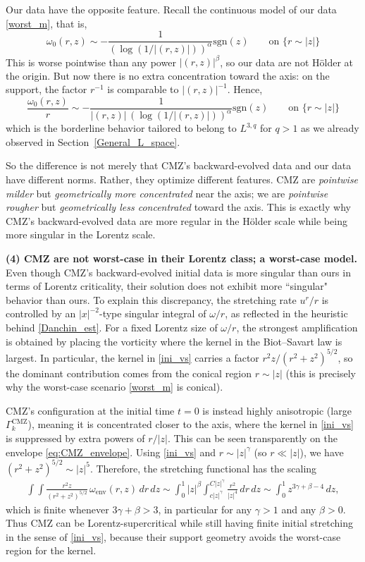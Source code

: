 \documentclass[reqno,11pt]{amsart}
\begin{document}
Our data have the opposite feature.  Recall the continuous model of our data \eqref{worst_m}, that is,
\[
\omega_0(r,z)\sim -\frac{1}{(\log(1/|(r,z)|))^\alpha}\mathrm{sgn}(z)
\qquad\text{on } \{r\sim |z|\}
\]
This is worse pointwise than any power $|(r,z)|^\beta$, so our data are not H\"older at
the origin.  But now there is no extra concentration toward the axis: on the support,
the factor $r^{-1}$ is  comparable to $|(r,z)|^{-1}$.  Hence, 
\[
\frac{\omega_0(r,z)}{r}
\sim
-\frac{1}{|(r,z)|\,(\log(1/|(r,z)|))^\alpha}\mathrm{sgn}(z) \qquad \text{on } \{r\sim |z|\}
\]
which is the borderline behavior tailored to belong to $L^{3,q}$ for $q>1$ as we already observed in Section~\ref{General_L_space}.

So the difference is not merely that CMZ's backward-evolved data and our data have different norms.
Rather, they optimize different features.  CMZ are \emph{pointwise milder} but
\emph{geometrically more concentrated} near the axis; we are \emph{pointwise rougher}
but \emph{geometrically less concentrated} toward the axis.  This is exactly why CMZ's
backward-evolved data are more regular in the H\"older scale while being more singular in the Lorentz
scale.



\medskip
\noindent\textbf{(4) CMZ are not worst-case in their Lorentz class; a worst-case model.}
Even though CMZ's backward-evolved initial data is more singular than ours in terms of Lorentz criticality, their solution does not exhibit more ``singular" behavior than ours. To explain this discrepancy,
the stretching rate $u^r/r$ is controlled by an $|x|^{-2}$-type singular integral of $\omega/r$,
as reflected in the heuristic behind \eqref{Danchin_est}.  For a fixed Lorentz size of $\omega/r$, the strongest
amplification is obtained by placing the vorticity where the kernel in the Biot--Savart law is
largest.  In particular, the kernel in \eqref{ini_vs} carries a factor $r^2 z/(r^2+z^2)^{5/2}$, so the
dominant contribution comes from the conical region $r\sim |z|$ (this is precisely why the
worst-case scenario \eqref{worst_m} is conical).

CMZ's configuration at the initial time $t=0$ is instead highly anisotropic
(large $\Gamma^{\mathrm{CMZ}}_{k}$), meaning it is concentrated closer to the axis, where the
kernel in \eqref{ini_vs} is suppressed by extra powers of $r/|z|$.
This can be seen transparently on the envelope \eqref{eq:CMZ_envelope}.  Using \eqref{ini_vs} and
$r\sim |z|^\gamma$ (so $r\ll|z|$), we have $(r^2+z^2)^{5/2}\sim |z|^5$.
Therefore, the stretching functional has the scaling
\begin{align*}
\int\!\!\int \frac{r^2 z}{(r^2+z^2)^{5/2}}\,\omega_{\mathrm{env}}(r,z)\,dr\,dz
\sim
\int_{0}^{1}|z|^{\beta}\int_{c|z|^\gamma}^{C|z|^\gamma}\frac{r^2}{|z|^4}\,dr\,dz \nonumber
\sim
\int_{0}^{1} z^{3\gamma+\beta-4}\,dz,
\end{align*}
which is finite whenever $3\gamma+\beta>3$, in particular for any $\gamma>1$ and any
$\beta>0$.
Thus CMZ can be Lorentz-supercritical while still having finite initial stretching in the
sense of \eqref{ini_vs}, because their support geometry avoids the worst-case region for the kernel.
\end{document}
